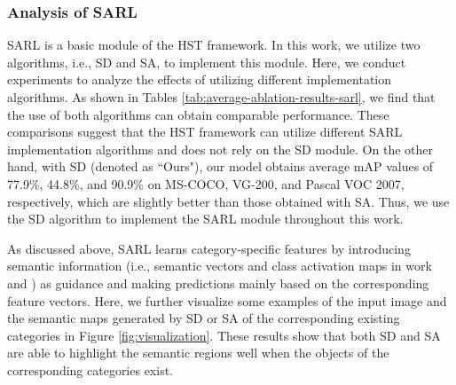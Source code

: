 \subsubsection{Analysis of SARL}
\label{sec:exp-sarl}
SARL is a basic module of the HST framework. In this work, we utilize two algorithms, i.e., SD and SA, to implement this module. Here, we conduct experiments to analyze the effects of utilizing different implementation algorithms. As shown in Tables \ref{tab:average-ablation-results-sarl}, we find that the use of both algorithms can obtain comparable performance. These comparisons suggest that the HST framework can utilize different SARL implementation algorithms and does not rely on the SD module. On the other hand, with SD (denoted as ``Ours"), our model obtains average mAP values of 77.9\%, 44.8\%, and 90.9\% on MS-COCO, VG-200, and Pascal VOC 2007, respectively, which are slightly better than those obtained with SA. Thus, we use the SD algorithm to implement the SARL module throughout this work.

As discussed above, SARL learns category-specific features by introducing semantic information (i.e., semantic vectors and class activation maps in work \cite{chen2019learning} and \cite{Ye2020ADD-GCN}) as guidance and making predictions mainly based on the corresponding feature vectors. Here, we further visualize some examples of the input image and the semantic maps generated by SD or SA of the corresponding existing categories in Figure \ref{fig:visualization}. These results show that both SD and SA are able to highlight the semantic regions well when the objects of the corresponding categories exist.

